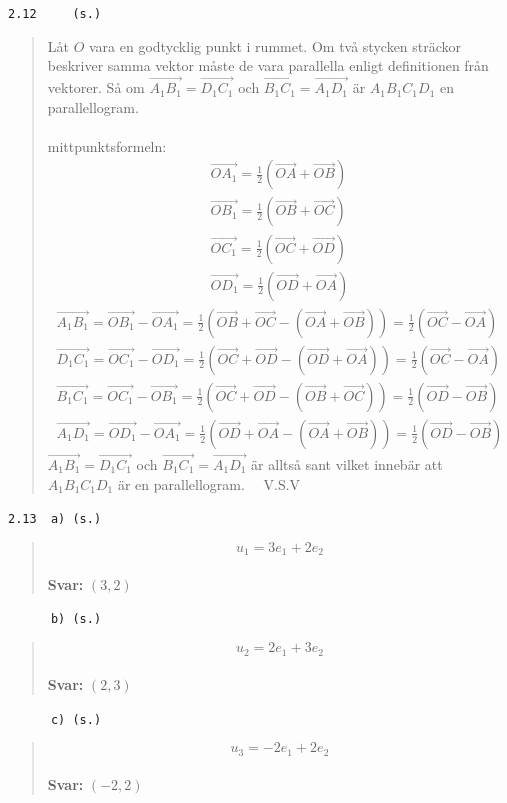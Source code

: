 \documentclass[a4paper]{article}
\newcommand{\tskcol}[1]{\textcolor{tskcol}{#1}}
\newcommand{\vek}[1]{\overrightarrow{#1}}
\begin{document}
\texttt{\tskcol{2.12~~~~ (s.)}}
\begin{quotation}
	\noindent
	Låt $O$ vara en godtycklig punkt i rummet. 
	Om två stycken sträckor beskriver samma vektor måste de vara parallella enligt definitionen från vektorer. 
	Så om $\vek{A_1B_1}=\vek{D_1C_1}$ och $\vek{B_1C_1}=\vek{A_1D_1}$ är $A_1B_1C_1D_1$ en parallellogram.
	\\ \\
	mittpunktsformeln:
	\[\begin{array}{l}
	\vek{OA_1}=\frac{1}{2}(\vek{OA}+\vek{OB}) \\
	\vek{OB_1}=\frac{1}{2}(\vek{OB}+\vek{OC}) \\
	\vek{OC_1}=\frac{1}{2}(\vek{OC}+\vek{OD}) \\
	\vek{OD_1}=\frac{1}{2}(\vek{OD}+\vek{OA})
	\end{array}\]
	\[\begin{array}{l}
	\vek{A_1B_1}=\vek{OB_1}-\vek{OA_1}=\frac{1}{2}(\vek{OB}+\vek{OC}-(\vek{OA}+\vek{OB}))=\frac{1}{2}(\vek{OC}-\vek{OA}) \\
	\vek{D_1C_1}=\vek{OC_1}-\vek{OD_1}=\frac{1}{2}(\vek{OC}+\vek{OD}-(\vek{OD}+\vek{OA}))=\frac{1}{2}(\vek{OC}-\vek{OA}) \\
	\vek{B_1C_1}=\vek{OC_1}-\vek{OB_1}=\frac{1}{2}(\vek{OC}+\vek{OD}-(\vek{OB}+\vek{OC}))=\frac{1}{2}(\vek{OD}-\vek{OB}) \\
	\vek{A_1D_1}=\vek{OD_1}-\vek{OA_1}=\frac{1}{2}(\vek{OD}+\vek{OA}-(\vek{OA}+\vek{OB}))=\frac{1}{2}(\vek{OD}-\vek{OB})
	\end{array}\]
	$\vek{A_1B_1}=\vek{D_1C_1}$ och $\vek{B_1C_1}=\vek{A_1D_1}$ är alltså sant vilket innebär att $A_1B_1C_1D_1$ är en parallellogram. ~~V.S.V
\end{quotation}

\texttt{\tskcol{2.13~~a) (s.)}}
\begin{quotation}
	\noindent
	\[u_1=3e_1+2e_2\]
	\\
	\textbf{Svar:} $(3,2)$
\end{quotation}

\texttt{\tskcol{~~~~~~b) (s.)}}
\begin{quotation}
	\noindent
	\[u_2=2e_1+3e_2\]
	\\
	\textbf{Svar:} $(2,3)$
\end{quotation}

\texttt{\tskcol{~~~~~~c) (s.)}}
\begin{quotation}
	\noindent
	\[u_3=-2e_1+2e_2\]
	\\
	\textbf{Svar:} $(-2,2)$
\end{quotation}
\end{document}
